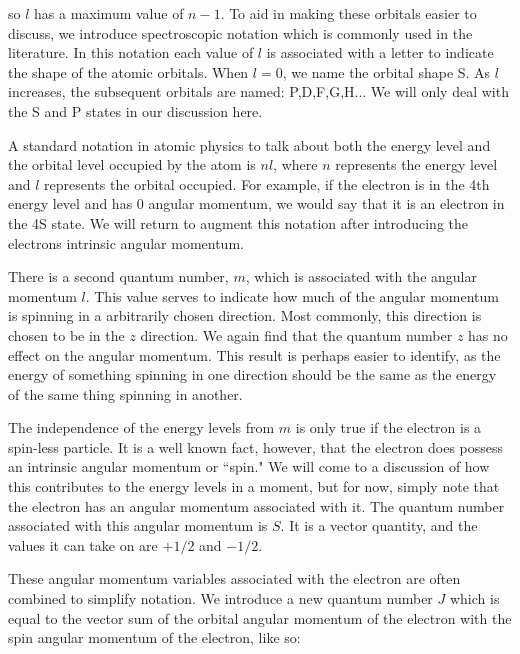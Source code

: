 \documentclass[letter,12pt]{article}
\begin{document}
		so $l$ has a maximum value of $n-1$. To aid in making
		these orbitals easier to discuss, we introduce 
		spectroscopic notation which is commonly used in the 
		literature. In this notation
		each value of $l$ is associated with a letter to indicate
		the shape of the atomic orbitals. When $l=0$, we name the 
		orbital shape S. As $l$ increases, the subsequent orbitals
		are named: P,D,F,G,H... We will only deal with the S and P 
		states in our discussion here. 

		A standard notation in atomic physics 
        to talk about both the energy level and
		the orbital level occupied by the atom is $nl$, where $n$
		represents the energy level and $l$ represents the orbital
		occupied. For example, if the electron is in the 4th energy
		level and has 0 angular momentum, we would say that it is
		an electron in the 4S state. We will return to augment this 
		notation after introducing the electrons intrinsic angular
		momentum.

		There is a second quantum number, $m$, which is associated 
		with the angular momentum $l$. This value serves to indicate
		how much of the angular momentum is spinning in a arbitrarily
		chosen direction. Most commonly, this direction is chosen
		to be in the $z$ direction. We again find that the quantum
        number $z$ has no effect on the angular momentum. This result
        is perhaps easier to identify, as the energy of something 
        spinning in one direction should be the same as the energy 
        of the same thing spinning in another. 

        The independence of the energy levels from $m$ is only true
        if the electron is a spin-less particle. It is a well known
        fact, however, that the electron does possess an intrinsic 
        angular momentum or ``spin." We will come to a discussion of 
        how this contributes to the energy levels in a moment, but 
        for now, simply note that the electron has an angular 
        momentum associated with it. The quantum number associated
        with this angular momentum is $S$. It is a vector 
		quantity, and the values it can take 
        on are $+1/2$ and $-1/2$.

        These angular momentum variables associated with the
        electron are often combined to simplify notation. We
        introduce a new quantum number $J$ which is equal to
        the vector sum of the orbital angular momentum of the
        electron with the spin angular momentum of the electron,
        like so: 
\end{document}
